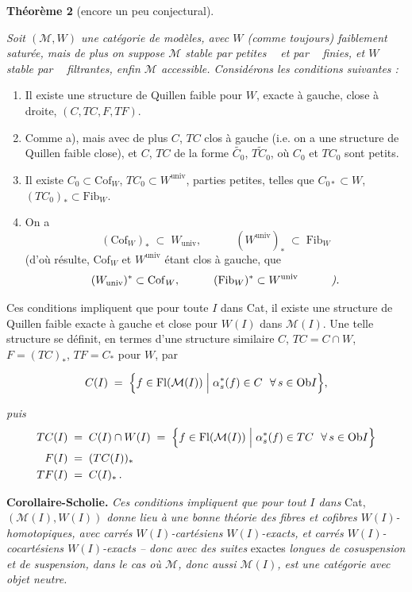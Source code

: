 \documentclass[11pt]{article}
\newcommand{\printedpage}[1]{\marginpar{\footnotesize p.~#1}}
\newcommand{\msp}[1]{\marginpar{\footnotesize [#1]}}
\newcommand{\Fl}{\mathrm{Fl}}
\newcommand{\M}{\mathcal{M}}
\newcommand{\Cof}{\mathrm{Cof}}
\newcommand{\Fib}{\mathrm{Fib}}
\newcommand{\Ob}{\mathrm{Ob}}
\newcommand{\univ}{\mathrm{univ}}
\newcommand{\limind}{\mathop{\underrightarrow{\mathrm{lim}}}}
\newcommand{\limproj}{\mathop{\underleftarrow{\mathrm{lim}}}}
\begin{document}
\textbf{Théorème 2} (encore un peu conjectural). {\itshape Soit $(\M,W)$ une catégorie de modèles, avec $W$ (comme toujours) faiblement saturée, mais de plus on suppose $\M$ stable par petites $\limind$ et par $\limproj$ finies, et $W$ stable par $\limind$ filtrantes, enfin $\M$ accessible. Considérons les conditions suivantes :

\begin{enumerate}
\item[\textup{a)}] Il existe une structure de Quillen faible pour $W$, exacte à gauche, close à droite, $(C,TC,F,TF)$.
\item[\textup{a$'$)}] Comme \textup{a)}, mais avec de plus $C$, $TC$ clos à gauche (\textup{i.e.} on a une structure de Quillen faible close), et $C$, $TC$ de la forme $\widetilde{C_0}$, $\widetilde{TC_0}$, où $C_0$ et $TC_0$ sont petits.
\item[\textup{a$''$)}] Il existe $C_0 \subset \Cof_W$, $TC_0 \subset W^{\univ}$, parties petites, telles que $C_{0*} \subset W$, $(TC_0)_* \subset \Fib_W$.
\item[\textup{b)}] On a
\[
(\Cof_W)_* \;\subset\; W_{\univ}, \qquad\quad (W^{\univ})_* \;\subset\; \Fib_W
\]
(d'où résulte, $\Cof_W$ et $W^{\univ}$ étant clos à gauche, que
\[
(W_{\univ})^* \subset \Cof_W, \qquad\quad (\Fib_W)^* \subset W^{\univ} \qquad\quad \text{\itshape ).}
\]
\end{enumerate}

\noindent\msp{page 43}

Ces conditions impliquent que pour toute $I$ dans \textup{Cat}, il existe une structure de Quillen faible exacte à gauche et close pour $W(I)$ dans $\M(I)$. Une telle structure se définit, en termes d'une structure similaire $C$, $TC = C \cap W$, $F = (TC)_*$, $TF = C_*$ pour $W$, par}
\[
C(I) \;=\; \Bigl\{ f \in \Fl(\M(I)) \Bigm| \alpha_s^*(f) \in C \ \ \forall\, s \in \Ob I \Bigr\},
\]

\printedpage{25}
\noindent\textit{puis}
\[
\begin{aligned}
TC(I) \;&=\; C(I)\cap W(I) \;=\; \Bigl\{ f \in \Fl(\M(I)) \Bigm| \alpha_s^*(f) \in TC \ \ \forall\, s \in \Ob I \Bigr\}\\
F(I) \;&=\; (TC(I))_*\\
TF(I) \;&=\; C(I)_*\,.
\end{aligned}
\]

\textbf{Corollaire-Scholie.} \textit{Ces conditions impliquent que pour tout $I$ dans} Cat, \textit{$(\M(I),W(I))$ donne lieu à une bonne théorie des fibres et cofibres $W(I)$-homotopiques, avec carrés $W(I)$-cartésiens $W(I)$-exacts, et carrés $W(I)$-cocartésiens $W(I)$-exacts – donc avec des suites} exactes \textit{longues de cosuspension et de suspension, dans le cas où $\M$, donc aussi $\M(I)$, est une catégorie avec objet neutre.}
\end{document}
